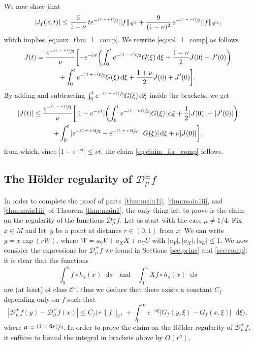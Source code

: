 \documentclass[JEP,XML,SOM,NoEqCountersInSection,Unicode,published]{cedram}
\newcommand{\psfrac}[2]{\sfrac{(#1)}{#2}}
\newcommand{\tpsfrac}[3]{\sfrac{(#1)#3}{#2}}
\newcommand*{\diff}{\mathop{}\!\mathrm{d}}
\newcommand{\Dpm}[1]{\mathcal{D}_\mu^{\pm} #1}
\theoremstyle{definition}
\begin{document}
We now show that
\begin{equation}\label{eq:claim_for_comp}
|J_f(x,t)|\leq \frac{6}{1-\nu}\, t e^{-\tpsfrac{1-\nu}{2}t} \|f\|_{\mathscr{C}^2} + \frac{9}{(1-\nu)^2}\, e^{-\tpsfrac{1-\nu}{2}t} \|f\|_{\mathscr{C}^2},
\end{equation}
which implies \eqref{eq:aux_thm_1_comp}.
We rewrite \eqref{eq:sol_1_comp} as follows
\begin{multline*}
J(t) = \frac{e^{-\tpsfrac{1-\nu}{2}t}}{\nu} \biggl[- e^{-\nu t} \biggl(\int_0^t e^{-\tpsfrac{1-\nu}{2}\xi} G(\xi) \diff \xi + \frac{1-\nu}{2} J(0)+J'(0) \biggr) \\
+ \int_0^t e^{-\tpsfrac{1+\nu}{2}\xi} G(\xi) \diff \xi + \frac{1+\nu}{2} J(0) + J'(0) \biggr].
\end{multline*}
By adding and subtracting $\int_0^t e^{-\tpsfrac{1-\nu}{2}\xi} G(\xi) \diff \xi$ inside the brackets, we get
\begin{multline*}
|J(t)|\leq \frac{e^{-\tpsfrac{1-\nu}{2}t}}{\nu} \biggl[|1 - e^{-\nu t}|\biggl(\int_0^t e^{-\tpsfrac{1-\nu}{2}\xi} |G(\xi)|\diff \xi + \frac{1}{2} |J(0)|+|J'(0)|\biggr) \\
+ \int_0^t |e^{-\tpsfrac{1+\nu}{2}\xi} - e^{-\tpsfrac{1-\nu}{2}\xi}|\, |G(\xi)|\diff \xi + \nu |J(0)|\biggr],
\end{multline*}
from which, since $|1-e^{-\nu t}|\leq \nu t$, the claim \eqref{eq:claim_for_comp} follows.


\subsection{The Hölder regularity of $\Dpm{f}$}

In order to complete the proof of parts~\eqref{thm:main1i}, \eqref{thm:main1ii}, and \eqref{thm:main1iii} of Theorem \ref{thm:main1}, the only thing left to prove is the claim on the regularity of the functions $\Dpm{f}$.
Let us start with the case $\mu \neq 1/4$.
Fix $x \in M$ and let~$y$ be a point at distance $r \in (0,1)$ from $x$. We can write $y = x \exp(rW)$, where \hbox{$W = a_VV+a_XX+a_UU$} with $|a_V|, |a_X|, |a_U|\leq 1$.
We now consider the expressions for $\Dpm{f}$ we found in Sections \ref{sec:princ} and \ref{sec:comp}:
it is clear that the functions
\[
\int_0^1 f \circ h_s(x) \diff s \quad\text{and}\quad \int_0^1 Xf \circ h_s(x) \diff s
\]
are (at least) of class $\mathscr{C}^1$, thus we deduce that there exists a constant $C_f$ depending only on $f$ such that
\[
|\Dpm{f}(y) - \Dpm{f}(x)|\leq C_{f} \biggl(r \|f\|_{\mathscr{C}^1} + \int_0^{\infty} e^{-a \xi} |G_{f}(y,\xi) -G_{f}(x,\xi) |\diff \xi \biggr),
\]
where $a = \psfrac{1\mp \Re \nu}{2}$.
In order to prove the claim on the Hölder regularity of $\Dpm{f}$, it suffices to bound the integral in brackets above by $O(r^a)$.
\end{document}
